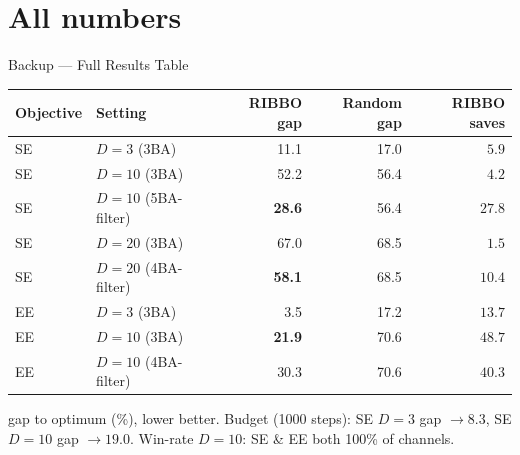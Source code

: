 \documentclass[10pt,aspectratio=169]{beamer}
\begin{document}
\section{All numbers}
\begin{frame}{Backup --- Full Results Table}
    \small
    \centering
    \begin{tabular}{llrrr}
        \toprule
        Objective & Setting & RIBBO gap & Random gap & RIBBO saves \\
        \midrule
        SE & $D{=}3$  (3BA)            & 11.1 & 17.0 & $5.9$  \\
        SE & $D{=}10$ (3BA)            & 52.2 & 56.4 & $4.2$  \\
        SE & $D{=}10$ (5BA-filter)     & \textbf{28.6} & 56.4 & $27.8$ \\
        SE & $D{=}20$ (3BA)            & 67.0 & 68.5 & $1.5$  \\
        SE & $D{=}20$ (4BA-filter)     & \textbf{58.1} & 68.5 & $10.4$ \\
        \midrule
        EE & $D{=}3$  (3BA)            & 3.5 & 17.2 & $13.7$ \\
        EE & $D{=}10$ (3BA)            & \textbf{21.9} & 70.6 & $\mathbf{48.7}$ \\
        EE & $D{=}10$ (4BA-filter)     & 30.3 & 70.6 & $40.3$ \\
        \bottomrule
    \end{tabular}

    \vspace{0.6em}
    {\footnotesize gap to optimum (\%), lower better. Budget (1000 steps): SE $D{=}3$ gap $\to 8.3$, SE $D{=}10$ gap $\to 19.0$. \quad
    Win-rate $D{=}10$: SE \& EE both 100\% of channels.}
\end{frame}

\end{document}

